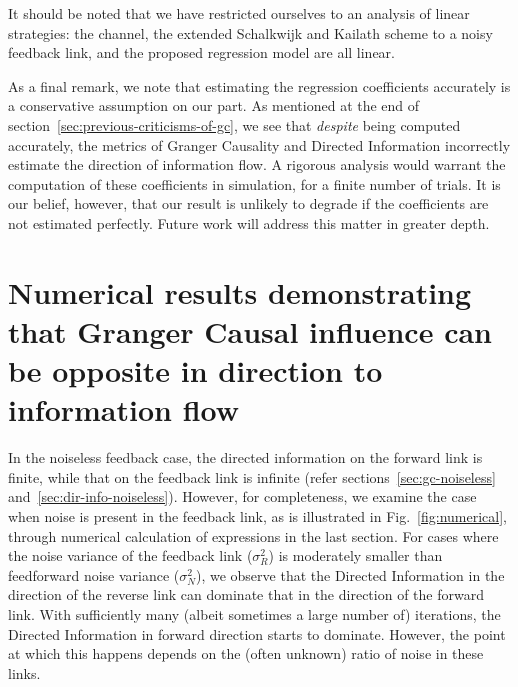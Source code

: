 \documentclass[letterpaper, 10pt, conference]{ieeeconf}
\begin{document}
It should be noted that we have restricted ourselves to an analysis of linear strategies: the channel, the extended Schalkwijk and Kailath scheme to a noisy feedback link, and the proposed regression model are all linear.

As a final remark, we note that estimating the regression coefficients accurately is a conservative assumption on our part. As mentioned at the end of section~\ref{sec:previous-criticisms-of-gc}, we see that \emph{despite} being computed accurately, the metrics of Granger Causality and Directed Information incorrectly estimate the direction of information flow. A rigorous analysis would warrant the computation of these coefficients in simulation, for a finite number of trials. It is our belief, however, that our result is unlikely to degrade if the coefficients are not estimated perfectly. Future work will address this matter in greater depth.


\section{Numerical results demonstrating that Granger Causal influence can be opposite in direction to information flow}
\label{sec:numerical-results}
In the noiseless feedback case, the directed information on the forward link is finite, while that on the feedback link is infinite (refer sections~\ref{sec:gc-noiseless} and~\ref{sec:dir-info-noiseless}). However, for completeness, we examine the case when noise is present in the feedback link, as is illustrated in Fig.~\ref{fig:numerical}, through numerical calculation of expressions in the last section. For cases where the noise variance of the feedback link ($\sigma_R^2$) is moderately smaller than feedforward noise variance ($\sigma_N^2$), we observe that the Directed Information in the direction of the reverse link can dominate that in the direction of the forward link. With sufficiently many (albeit sometimes a large number of) iterations, the Directed Information in forward direction starts to dominate. However, the point at which this happens depends on the (often unknown) ratio of noise in these links.
\end{document}
